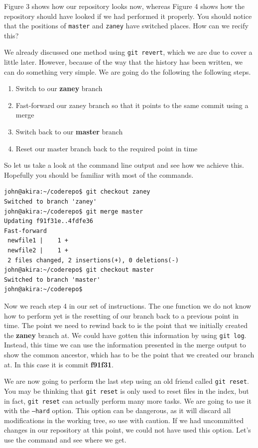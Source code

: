 Figure 3 shows how our repository looks now, whereas Figure 4 shows how the repository should have looked if we had performed it properly.  You should notice that the positions of \texttt{master} and \texttt{zaney} have switched places.  How can we recify this?

We already discussed one method using \texttt{git revert}, which we are due to cover a little later.  However, because of the way that the history has been written, we can do something very simple.  We are going do the following the following steps.

\begin{enumerate}
\item Switch to our \textbf{zaney} branch
\item Fast-forward our zaney branch so that it points to the same commit using a merge
\item Switch back to our \textbf{master} branch
\item Reset our master branch back to the required point in time
\end{enumerate}

So let us take a look at the command line output and see how we achieve this.  Hopefully you should be familiar with most of the commands.

\begin{Verbatim}[frame=leftline,framerule=1mm,fontsize=\relsize{-3}] 
john@akira:~/coderepo$ git checkout zaney
Switched to branch 'zaney'
john@akira:~/coderepo$ git merge master
Updating f91f31e..4fdfe36
Fast-forward
 newfile1 |    1 +
 newfile2 |    1 +
 2 files changed, 2 insertions(+), 0 deletions(-)
john@akira:~/coderepo$ git checkout master
Switched to branch 'master'
john@akira:~/coderepo$ 
\end{Verbatim}

Now we reach step 4 in our set of instructions.  The one function we do not know how to perform yet is the resetting of our branch back to a previous point in time.  The point we need to rewind back to is the point that we initially created the \textbf{zaney} branch at.  We could have gotten this information by using \texttt{git log}.  Instead, this time we can use the information presented in the merge output to show the common ancestor, which has to be the point that we created our branch at.  In this case it is commit \textbf{f91f31}.

We are now going to perform the last step using an old friend called \texttt{git reset}.  You may be thinking that \texttt{git reset} is only used to reset files in the index, but in fact, \texttt{git reset} can actually perform many more tasks.  We are going to use it with the \texttt{--hard} option.  This option can be dangerous, as it will discard all modifications in the working tree, so use with caution.  If we had uncommitted changes in our repository at this point, we could not have used this option.  Let's use the command and see where we get.

